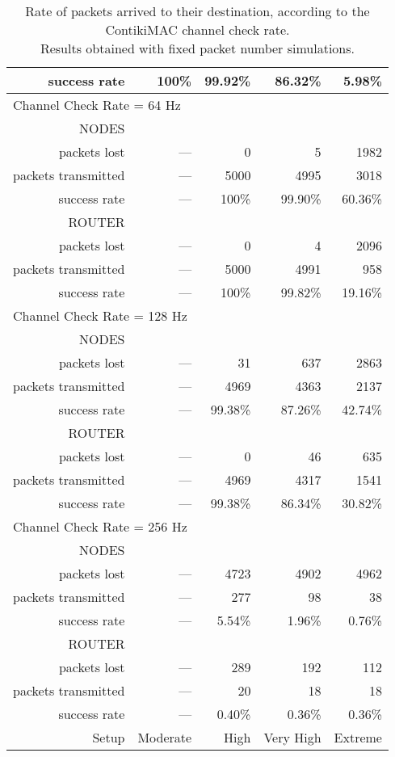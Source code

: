 \documentclass[a4paper,twoside]{article}
\begin{document}
\begin{table*}[htbp]
\begin{tabular}{|r|r|r|r|r|}
success rate & 100\% & 99.92\% & 86.32\% & 5.98\% \\
\hline
\multicolumn{5}{|l|}{Channel Check Rate = 64 Hz}\\
\hline
NODES & & & & \\
packets lost & --- & 0 & 5 & 1982 \\
packets transmitted & --- & 5000 & 4995 & 3018 \\
success rate & --- & 100\% & 99.90\% & 60.36\% \\
ROUTER & & & & \\
packets lost & --- & 0 & 4 & 2096 \\
packets transmitted & --- & 5000 & 4991 & 958 \\
success rate & --- & 100\% & 99.82\% & 19.16\% \\
\hline
\multicolumn{5}{|l|}{Channel Check Rate = 128 Hz}\\
\hline
NODES & & & & \\
packets lost & --- & 31 & 637 & 2863 \\
packets transmitted & --- & 4969 & 4363 & 2137 \\
success rate & --- & 99.38\% & 87.26\% & 42.74\% \\
ROUTER & & & & \\
packets lost & --- & 0 & 46 & 635 \\
packets transmitted & --- & 4969 & 4317 & 1541 \\
success rate & --- & 99.38\% & 86.34\% & 30.82\% \\
\hline
\multicolumn{5}{|l|}{Channel Check Rate = 256 Hz}\\
\hline
NODES & & & & \\
packets lost & --- & 4723 & 4902 & 4962 \\
packets transmitted & --- & 277 & 98 & 38 \\
success rate & --- & 5.54\% & 1.96\% & 0.76\% \\
ROUTER & & & & \\
packets lost & --- & 289 & 192 & 112 \\
packets transmitted & --- & 20 & 18 & 18 \\
success rate & --- & 0.40\% & 0.36\% & 0.36\% \\
\hline
Setup & Moderate & High & Very High & Extreme \\
\hline
\end{tabular}
\caption{Rate of packets arrived to their destination,
         according to the ContikiMAC channel check rate.\\
         Results obtained with fixed packet number simulations.}
\label{TblSuccessRate}
\end{table*}
\end{document}
